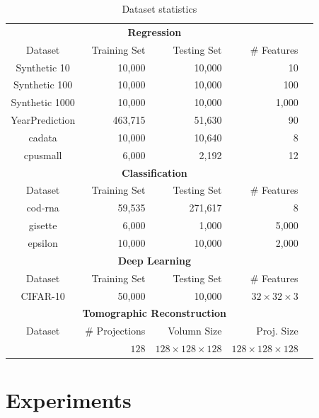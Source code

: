 \documentclass{article}
\begin{document}
\begin{table}[t]
\tiny
\centering
\begin{tabular}{crrrr}
\hline
\multicolumn{4}{c}{\bf Regression}\\
Dataset           & Training Set & Testing Set & \# Features  \\
\hline
Synthetic 10   & 10,000        & 10,000       & 10               \\
Synthetic 100  & 10,000        & 10,000       & 100              \\
Synthetic 1000 & 10,000        & 10,000       & 1,000           \\
YearPrediction & 463,715       & 51,630       & 90                  \\
cadata         & 10,000        & 10,640       & 8                   \\
cpusmall       & 6,000         & 2,192        & 12     \\
\hline
\hline
\multicolumn{4}{c}{\bf Classification}\\
Dataset           & Training Set & Testing Set & \# Features \\
\hline
cod-rna        & 59,535        & 271,617      & 8    \\
gisette        & 6,000         & 1,000        & 5,000  \\  
epsilon        & 10,000        & 10,000       & 2,000\\  
\hline
\hline
\multicolumn{4}{c}{\bf Deep Learning}\\
Dataset           & Training Set & Testing Set & \# Features \\
\hline
CIFAR-10        & 50,000        & 10,000      &$32\times 32\times 3$     \\
\hline
\hline
\multicolumn{4}{c}{\bf Tomographic Reconstruction}\\
Dataset           & \# Projections & Volumn Size & Proj. Size \\
\hline
                  & $128$            & $128\times 128\times 128$      & $128\times 128\times 128$     \\
\hline
\end{tabular}
\vspace{-1em}
\caption{Dataset statistics}
\vspace{-1.5em}
\label{table:dataset}
\end{table}

\vspace{-0.5em}
\section{Experiments} \label{sec:exp}
\end{document}
